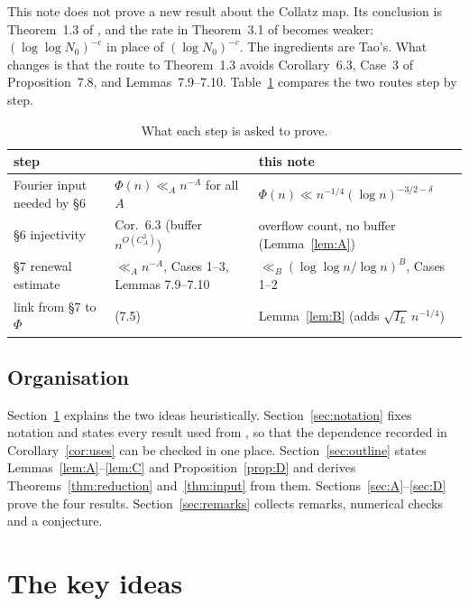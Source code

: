 \documentclass[11pt]{amsart}
\theoremstyle{remark}
\newcommand{\Tc}{\cite{Tao22}}         %
\theoremstyle{plain}
\begin{document}
This note does not prove a new result about the Collatz map. Its conclusion is Theorem~1.3 of \Tc, and the rate in Theorem~3.1 of \Tc{} becomes weaker: $(\log\log N_0)^{-c}$ in place of $(\log N_0)^{-c}$. The ingredients are Tao's. What changes is that the route to Theorem~1.3 avoids Corollary~6.3, Case~3 of Proposition~7.8, and Lemmas~7.9--7.10. Table~\ref{tab:compare} compares the two routes step by step.

\begin{table}[h]
\centering
\small
\begin{tabular}{@{}lll@{}}
\toprule
step & \Tc & this note \\
\midrule
Fourier input needed by \S6 & $\Phi(n)\ll_A n^{-A}$ for all $A$ & $\Phi(n)\ll n^{-1/4}(\log n)^{-3/2-\delta}$ \\
\S6 injectivity & Cor.~6.3 (buffer $n^{O(C_A^2)}$) & overflow count, no buffer (Lemma~\ref{lem:A}) \\
\S7 renewal estimate & $\ll_A n^{-A}$, Cases 1--3, Lemmas 7.9--7.10 & $\ll_B(\log\log n/\log n)^B$, Cases 1--2 \\
link from \S7 to $\Phi$ & (7.5) & Lemma~\ref{lem:B} (adds $\sqrt{I_L}\,n^{-1/4}$) \\
\bottomrule
\end{tabular}
\caption{What each step is asked to prove.}\label{tab:compare}
\end{table}

\subsection*{Organisation}
Section~\ref{sec:ideas} explains the two ideas heuristically. Section~\ref{sec:notation} fixes notation and states every result used from \Tc, so that the dependence recorded in Corollary~\ref{cor:uses} can be checked in one place. Section~\ref{sec:outline} states Lemmas~\ref{lem:A}--\ref{lem:C} and Proposition~\ref{prop:D} and derives Theorems~\ref{thm:reduction} and~\ref{thm:input} from them. Sections~\ref{sec:A}--\ref{sec:D} prove the four results. Section~\ref{sec:remarks} collects remarks, numerical checks and a conjecture.

\section{The key ideas}\label{sec:ideas}
\end{document}
